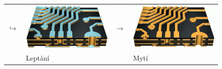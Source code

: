 \documentclass{beamer}
\begin{document}
\begin{frame}
\begin{center}
\begin{tabular}{m{0.05\linewidth} m{0.38\linewidth} m{0.05\linewidth} m{0.38\linewidth}}
		 \Large\textbf{$\hookrightarrow$} & \includegraphics[scale=0.12]{vnejsiLeptani.png} & \Large\textbf{$\rightarrow$} & \includegraphics[scale=0.12]{vnejsiHotovo.png}\\
		& Leptání & & Mytí
		\end{tabular}
	\end{center}
\end{frame}
\end{document}

